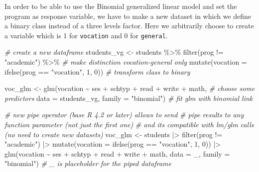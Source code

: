 \documentclass[
  oneside]{book}
\newenvironment{Shaded}{\begin{snugshade}}{\end{snugshade}}
\newcommand{\AttributeTok}[1]{\textcolor[rgb]{0.77,0.63,0.00}{#1}}
\newcommand{\CommentTok}[1]{\textcolor[rgb]{0.56,0.35,0.01}{\textit{#1}}}
\newcommand{\DecValTok}[1]{\textcolor[rgb]{0.00,0.00,0.81}{#1}}
\newcommand{\FunctionTok}[1]{\textcolor[rgb]{0.00,0.00,0.00}{#1}}
\newcommand{\NormalTok}[1]{#1}
\newcommand{\OtherTok}[1]{\textcolor[rgb]{0.56,0.35,0.01}{#1}}
\newcommand{\SpecialCharTok}[1]{\textcolor[rgb]{0.00,0.00,0.00}{#1}}
\newcommand{\StringTok}[1]{\textcolor[rgb]{0.31,0.60,0.02}{#1}}
\begin{document}
In order to be able to use the Binomial generalized linear model
and set the program as response variable, we have to make a new
dataset in which we define a binary class instead of a three levels
factor. Here we arbitrarily choose to create a variable which is
1 for \texttt{vocation} and 0 for \texttt{general}.

\begin{Shaded}
\begin{Highlighting}[]
\CommentTok{\# create a new dataframe }
\NormalTok{students\_vg }\OtherTok{\textless{}{-}}\NormalTok{ students }\SpecialCharTok{\%\textgreater{}\%}
  \FunctionTok{filter}\NormalTok{(prog }\SpecialCharTok{!=} \StringTok{"academic"}\NormalTok{) }\SpecialCharTok{\%\textgreater{}\%} \CommentTok{\# make distinction vocation{-}general only}
  \FunctionTok{mutate}\NormalTok{(}\AttributeTok{vocation =} \FunctionTok{ifelse}\NormalTok{(prog }\SpecialCharTok{==} \StringTok{"vocation"}\NormalTok{, }\DecValTok{1}\NormalTok{, }\DecValTok{0}\NormalTok{)) }\CommentTok{\# transform class to binary}

\NormalTok{voc\_glm }\OtherTok{\textless{}{-}} \FunctionTok{glm}\NormalTok{(vocation }\SpecialCharTok{\textasciitilde{}}\NormalTok{ ses }\SpecialCharTok{+}\NormalTok{ schtyp }\SpecialCharTok{+}\NormalTok{ read }\SpecialCharTok{+}\NormalTok{ write }\SpecialCharTok{+}\NormalTok{ math, }\CommentTok{\# choose some predictors}
      \AttributeTok{data =}\NormalTok{ students\_vg, }\AttributeTok{family =} \StringTok{"binomial"}\NormalTok{) }\CommentTok{\# fit glm with binomial link }
\end{Highlighting}
\end{Shaded}

\begin{Shaded}
\begin{Highlighting}[]
\CommentTok{\# new pipe operator (base R 4.2 or later) allows to send}
\CommentTok{\# pipe results to any function parameter (not just the first one)}
\CommentTok{\# and it\textquotesingle{}s compatible with lm/glm calls (no need to create new datasets)}
\NormalTok{voc\_glm }\OtherTok{\textless{}{-}}\NormalTok{ students }\SpecialCharTok{|\textgreater{}}
  \FunctionTok{filter}\NormalTok{(prog }\SpecialCharTok{!=} \StringTok{"academic"}\NormalTok{) }\SpecialCharTok{|\textgreater{}}
  \FunctionTok{mutate}\NormalTok{(}\AttributeTok{vocation =} \FunctionTok{ifelse}\NormalTok{(prog }\SpecialCharTok{==} \StringTok{"vocation"}\NormalTok{, }\DecValTok{1}\NormalTok{, }\DecValTok{0}\NormalTok{)) }\SpecialCharTok{|\textgreater{}}
  \FunctionTok{glm}\NormalTok{(vocation }\SpecialCharTok{\textasciitilde{}}\NormalTok{ ses }\SpecialCharTok{+}\NormalTok{ schtyp }\SpecialCharTok{+}\NormalTok{ read }\SpecialCharTok{+}\NormalTok{ write }\SpecialCharTok{+}\NormalTok{ math,}
      \AttributeTok{data =}\NormalTok{ \_, }\AttributeTok{family =} \StringTok{"binomial"}\NormalTok{)}
  \CommentTok{\# \textasciigrave{}\_\textasciigrave{} is placeholder for the piped dataframe}
\end{Highlighting}
\end{Shaded}
\end{document}
